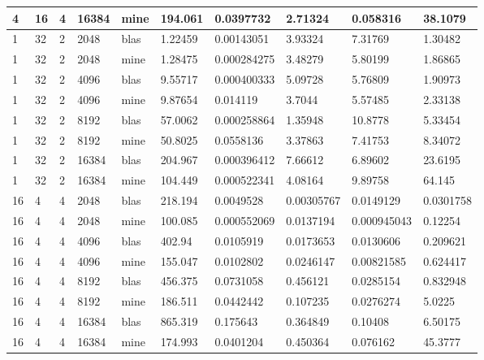 \documentclass{article}
\begin{document}
\begin{table}[]
{\begin{tabular}{|l|l|l|l|l|l|l|l|l|l|}
4       & 16        & 4     & 16384 & mine & 194.061 & 0.0397732   & 2.71324    & 0.058316    & 38.1079   \\ \hline
1       & 32        & 2     & 2048  & blas & 1.22459 & 0.00143051  & 3.93324    & 7.31769     & 1.30482   \\ \hline
1       & 32        & 2     & 2048  & mine & 1.28475 & 0.000284275 & 3.48279    & 5.80199     & 1.86865   \\ \hline
1       & 32        & 2     & 4096  & blas & 9.55717 & 0.000400333 & 5.09728    & 5.76809     & 1.90973   \\ \hline
1       & 32        & 2     & 4096  & mine & 9.87654 & 0.014119    & 3.7044     & 5.57485     & 2.33138   \\ \hline
1       & 32        & 2     & 8192  & blas & 57.0062 & 0.000258864 & 1.35948    & 10.8778     & 5.33454   \\ \hline
1       & 32        & 2     & 8192  & mine & 50.8025 & 0.0558136   & 3.37863    & 7.41753     & 8.34072   \\ \hline
1       & 32        & 2     & 16384 & blas & 204.967 & 0.000396412 & 7.66612    & 6.89602     & 23.6195   \\ \hline
1       & 32        & 2     & 16384 & mine & 104.449 & 0.000522341 & 4.08164    & 9.89758     & 64.145    \\ \hline
16      & 4         & 4     & 2048  & blas & 218.194 & 0.0049528   & 0.00305767 & 0.0149129   & 0.0301758 \\ \hline
16      & 4         & 4     & 2048  & mine & 100.085 & 0.000552069 & 0.0137194  & 0.000945043 & 0.12254   \\ \hline
16      & 4         & 4     & 4096  & blas & 402.94  & 0.0105919   & 0.0173653  & 0.0130606   & 0.209621  \\ \hline
16      & 4         & 4     & 4096  & mine & 155.047 & 0.0102802   & 0.0246147  & 0.00821585  & 0.624417  \\ \hline
16      & 4         & 4     & 8192  & blas & 456.375 & 0.0731058   & 0.456121   & 0.0285154   & 0.832948  \\ \hline
16      & 4         & 4     & 8192  & mine & 186.511 & 0.0442442   & 0.107235   & 0.0276274   & 5.0225    \\ \hline
16      & 4         & 4     & 16384 & blas & 865.319 & 0.175643    & 0.364849   & 0.10408     & 6.50175   \\ \hline
16      & 4         & 4     & 16384 & mine & 174.993 & 0.0401204   & 0.450364   & 0.076162    & 45.3777   \\ \hline

\end{tabular}}
\end{table}
\end{document}
